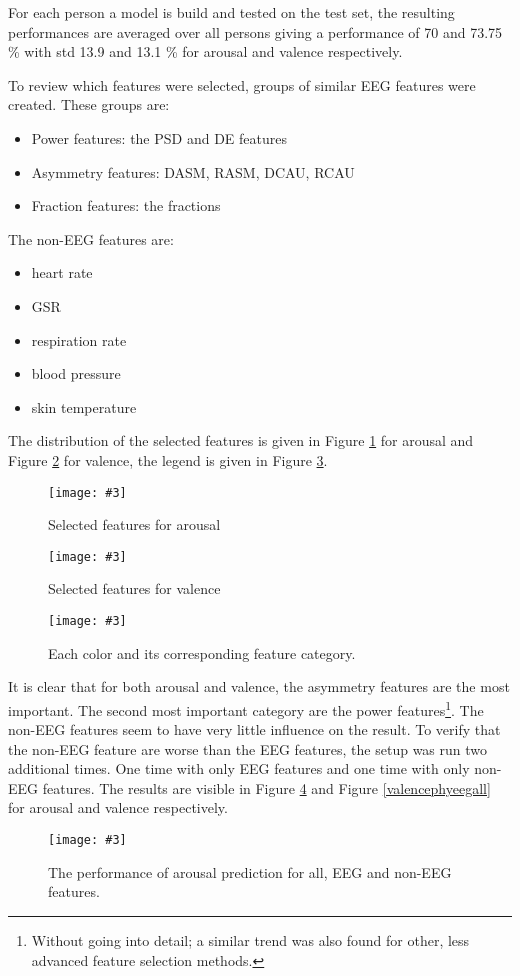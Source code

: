 \documentclass[12pt,journal,compsoc]{IEEEtran}
\newcommand{\npar}{\par \vspace{2.3ex plus 0.3ex minus 0.3ex}}
\newcommand{\mijnfiguur}[4][H]{            %
    \begin{figure}[#1]                      %
        \begin{center}                      %
            \texttt{[image: \#3]}        %
            \caption{#4\label{#3}}          %
        \end{center}
    \end{figure}
    }
\begin{document}
\npar

For each person a model is build and tested on the test set, the resulting performances are averaged over all persons giving a performance of  70 and 73.75 \% with std 13.9 and 13.1 \% for arousal and valence respectively. 

\npar

To review which features were selected, groups of similar EEG features were created. These groups are:
\begin{itemize}
\item Power features: the PSD and DE features
\item Asymmetry features: DASM, RASM, DCAU, RCAU
\item Fraction features: the fractions
\end{itemize}
The non-EEG features are:
\begin{itemize}
\item heart rate
\item GSR
\item respiration rate
\item blood pressure
\item skin temperature
\end{itemize}
The distribution of the selected features is given in Figure \ref{arousalALLRF} for arousal and Figure \ref{valenceALLRF} for valence, the legend is given in Figure \ref{legend}.

\mijnfiguur{width=0.25\textwidth}{arousalALLRF}{Selected features for arousal}
\mijnfiguur{width=0.25\textwidth}{valenceALLRF}{Selected features for valence}
\mijnfiguur{width=0.25\textwidth}{legend}{Each color and its corresponding feature category.}

It is clear that for both arousal and valence, the asymmetry features are the most important. The second most important category are the power features\footnote{Without going into detail; a similar trend was also found for other, less advanced feature selection methods.}. The non-EEG features seem to have very little influence on the result. To verify that the non-EEG feature are worse than the EEG features, the setup was run two additional times. One time with only EEG features and one time with only non-EEG features. The results are visible in Figure \ref{arousalphyeegall} and Figure \ref{valencephyeegall} for arousal and valence respectively. 

\mijnfiguur{width=.5\textwidth}{arousalphyeegall}{The performance of arousal prediction for all, EEG and non-EEG features.}
\end{document}
